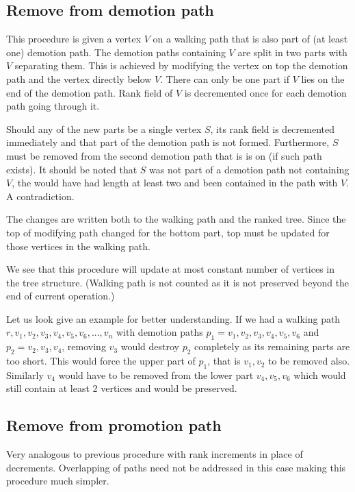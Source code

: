 \subsection{Remove from demotion path}

This procedure is given a vertex $V$ on a walking path that is also part of (at least one) demotion path. The demotion paths containing $V$ are split in two parts with $V$ separating them. This is achieved by modifying the vertex on top the demotion path and the vertex directly below $V$. There can only be one part if $V$ lies on the end of the demotion path. Rank field of $V$ is decremented once for each demotion path going through it. 

Should any of the new parts be a single vertex $S$, its rank field is decremented immediately and that part of the demotion path is not formed. Furthermore, $S$ must be removed from the second demotion path that is is on (if such path exists). It should be noted that $S$ was not part of a demotion path not containing $V$, the would have had length at least two and been contained in the path with $V$. A contradiction. 

The changes are written both to the walking path and the ranked tree. Since the top of modifying path changed for the bottom part, top must be updated for those vertices in the walking path.

We see that this procedure will update at most constant number of vertices in the tree structure. (Walking path is not counted as it is not preserved beyond the end of current operation.)

Let us look give an example for better understanding. If we had a walking path $r,v_1,v_2,v_3,v_4,v_5,v_6,...,v_n$ with demotion paths $p_1 = v_1,v_2,v_3,v_4,v_5,v_6$ and $p_2 = v_2,v_3,v_4$, removing $v_3$ would destroy $p_2$ completely as its remaining parts are too short. This would force the upper part of $p_1$, that is $v_1,v_2$ to be removed also. Similarly $v_4$ would have to be removed from the lower part $v_4,v_5,v_6$ which would still contain at least 2 vertices and would be preserved.


\subsection{Remove from promotion path}

Very analogous to previous procedure with rank increments in place of decrements. Overlapping of paths need not be addressed in this case making this procedure much simpler.

